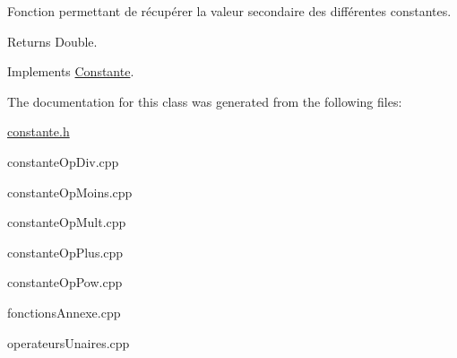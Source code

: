 Fonction permettant de récupérer la valeur secondaire des différentes constantes. 

\begin{DoxyReturn}{Returns}
Double. 
\end{DoxyReturn}


Implements \hyperlink{class_constante_aa0602d62c04f28f7bda68723f5dbc48b}{Constante}.



The documentation for this class was generated from the following files\-:\begin{DoxyCompactItemize}
\item 
\hyperlink{constante_8h}{constante.\-h}\item 
constante\-Op\-Div.\-cpp\item 
constante\-Op\-Moins.\-cpp\item 
constante\-Op\-Mult.\-cpp\item 
constante\-Op\-Plus.\-cpp\item 
constante\-Op\-Pow.\-cpp\item 
fonctions\-Annexe.\-cpp\item 
operateurs\-Unaires.\-cpp\end{DoxyCompactItemize}
